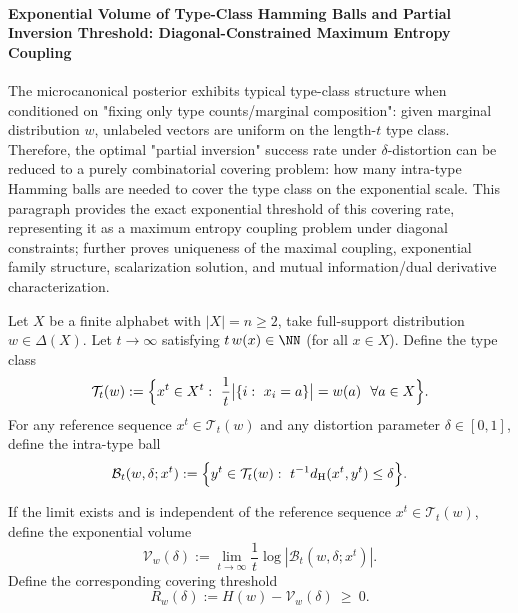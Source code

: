 
\paragraph{Exponential Volume of Type-Class Hamming Balls and Partial Inversion Threshold: Diagonal-Constrained Maximum Entropy Coupling}
The microcanonical posterior exhibits typical type-class structure when conditioned on "fixing only type counts/marginal composition": given marginal distribution \(w\), unlabeled vectors are uniform on the length-\(t\) type class.
Therefore, the optimal "partial inversion" success rate under \(\delta\)-distortion can be reduced to a purely combinatorial covering problem:
how many intra-type Hamming balls are needed to cover the type class on the exponential scale.
This paragraph provides the exact exponential threshold of this covering rate, representing it as a maximum entropy coupling problem under diagonal constraints;
further proves uniqueness of the maximal coupling, exponential family structure, scalarization solution, and mutual information/dual derivative characterization.

\begin{definition}\label{def:pom-typeclass-and-hamming-ball}
Let \(X\) be a finite alphabet with \(|X|=n\ge 2\), take full-support distribution \(w\in\Delta(X)\).
Let \(t\to\infty\) satisfying \(t\,w(x)\in\NN\) (for all \(x\in X\)).
Define the type class
\[
\mathcal T_t(w):=\Bigl\{x^t\in X^t:\ \frac{1}{t}\bigl|\{i:\ x_i=a\}\bigr|=w(a)\ \ \forall a\in X\Bigr\}.
\]
For any reference sequence \(x^t\in\mathcal T_t(w)\) and any distortion parameter \(\delta\in[0,1]\), define the intra-type ball
\[
\mathcal B_t(w,\delta;x^t):=\Bigl\{y^t\in\mathcal T_t(w):\ t^{-1}d_{\rm H}(x^t,y^t)\le \delta\Bigr\}.
\]
\end{definition}

\begin{definition}\label{def:pom-typeclass-volume-and-threshold}
If the limit exists and is independent of the reference sequence \(x^t\in\mathcal T_t(w)\), define the exponential volume
\[
\mathcal V_w(\delta):=\lim_{t\to\infty}\frac{1}{t}\log|\mathcal B_t(w,\delta;x^t)|.
\]
Define the corresponding covering threshold
\[
R_w(\delta):=H(w)-\mathcal V_w(\delta)\ \ge\ 0.
\]
\end{definition}


